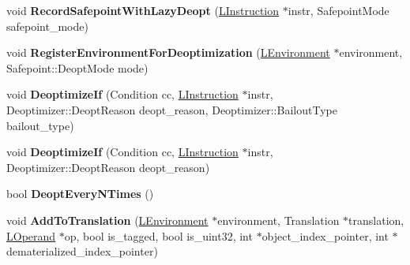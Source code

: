 \begin{DoxyCompactItemize}
\item 
void {\bfseries Record\+Safepoint\+With\+Lazy\+Deopt} (\hyperlink{classv8_1_1internal_1_1_l_instruction}{L\+Instruction} $\ast$instr, Safepoint\+Mode safepoint\+\_\+mode)\hypertarget{classv8_1_1internal_1_1_l_code_gen_ae96e1ea2617dfdd8a23b554d85bdd250}{}\label{classv8_1_1internal_1_1_l_code_gen_ae96e1ea2617dfdd8a23b554d85bdd250}

\item 
void {\bfseries Register\+Environment\+For\+Deoptimization} (\hyperlink{classv8_1_1internal_1_1_l_environment}{L\+Environment} $\ast$environment, Safepoint\+::\+Deopt\+Mode mode)\hypertarget{classv8_1_1internal_1_1_l_code_gen_a8e3566b9bf7194223c47e7dac6fd6a10}{}\label{classv8_1_1internal_1_1_l_code_gen_a8e3566b9bf7194223c47e7dac6fd6a10}

\item 
void {\bfseries Deoptimize\+If} (Condition cc, \hyperlink{classv8_1_1internal_1_1_l_instruction}{L\+Instruction} $\ast$instr, Deoptimizer\+::\+Deopt\+Reason deopt\+\_\+reason, Deoptimizer\+::\+Bailout\+Type bailout\+\_\+type)\hypertarget{classv8_1_1internal_1_1_l_code_gen_a9d452933b6c4ab49e99819782c3d3bd2}{}\label{classv8_1_1internal_1_1_l_code_gen_a9d452933b6c4ab49e99819782c3d3bd2}

\item 
void {\bfseries Deoptimize\+If} (Condition cc, \hyperlink{classv8_1_1internal_1_1_l_instruction}{L\+Instruction} $\ast$instr, Deoptimizer\+::\+Deopt\+Reason deopt\+\_\+reason)\hypertarget{classv8_1_1internal_1_1_l_code_gen_ac1bc02d00cc21a8407b9d2832809938c}{}\label{classv8_1_1internal_1_1_l_code_gen_ac1bc02d00cc21a8407b9d2832809938c}

\item 
bool {\bfseries Deopt\+Every\+N\+Times} ()\hypertarget{classv8_1_1internal_1_1_l_code_gen_a2fde56b4e76b315c3b53cf919409d719}{}\label{classv8_1_1internal_1_1_l_code_gen_a2fde56b4e76b315c3b53cf919409d719}

\item 
void {\bfseries Add\+To\+Translation} (\hyperlink{classv8_1_1internal_1_1_l_environment}{L\+Environment} $\ast$environment, Translation $\ast$translation, \hyperlink{classv8_1_1internal_1_1_l_operand}{L\+Operand} $\ast$op, bool is\+\_\+tagged, bool is\+\_\+uint32, int $\ast$object\+\_\+index\+\_\+pointer, int $\ast$dematerialized\+\_\+index\+\_\+pointer)\hypertarget{classv8_1_1internal_1_1_l_code_gen_a418f466c19b6671a29663f4378a36d8c}{}\label{classv8_1_1internal_1_1_l_code_gen_a418f466c19b6671a29663f4378a36d8c}


\end{DoxyCompactItemize}
